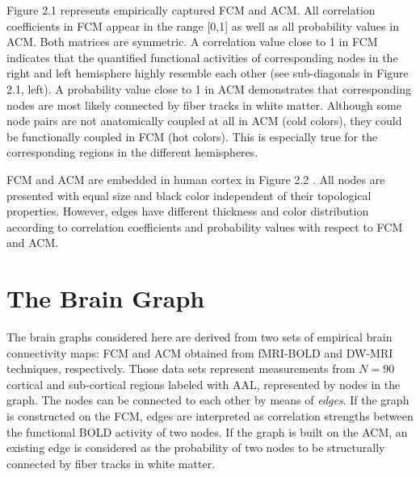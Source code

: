 Figure 2.1 represents empirically captured FCM and ACM. All correlation coefficients in FCM appear in the range [0,1] as well as all probability values in ACM. Both matrices are symmetric. A correlation value close to 1 in FCM indicates that the quantified functional activities of corresponding nodes in the right and left hemisphere highly resemble each other (see sub-diagonals in Figure 2.1, left). A probability value close to 1 in ACM demonstrates that corresponding nodes are most likely connected by fiber tracks in white matter. Although some node pairs are not anatomically coupled at all in ACM (cold colors), they could be functionally coupled in FCM (hot colors). This is especially true for the corresponding regions in the different hemispheres.    

FCM and ACM are embedded in human cortex in Figure 2.2 \citep{XYZ13}. All nodes are presented with equal size and black color independent of their topological properties. However, edges have different thickness and color distribution according to correlation coefficients and probability values with respect to FCM and ACM. 
 
   
\section{The Brain Graph}

The brain graphs considered here are derived from two sets of empirical brain connectivity maps: FCM and ACM obtained from fMRI-BOLD and DW-MRI techniques, respectively. Those data sets represent measurements from $N=90$ cortical and sub-cortical regions labeled with AAL, represented by nodes in the graph. The nodes can be connected to each other by means of \textit{edges}. If the graph is constructed on the FCM, edges are interpreted as correlation strengths between the functional BOLD activity of two nodes. If the graph is built on the ACM, an existing edge is considered as the probability of two nodes to be structurally connected by fiber tracks in white matter.


